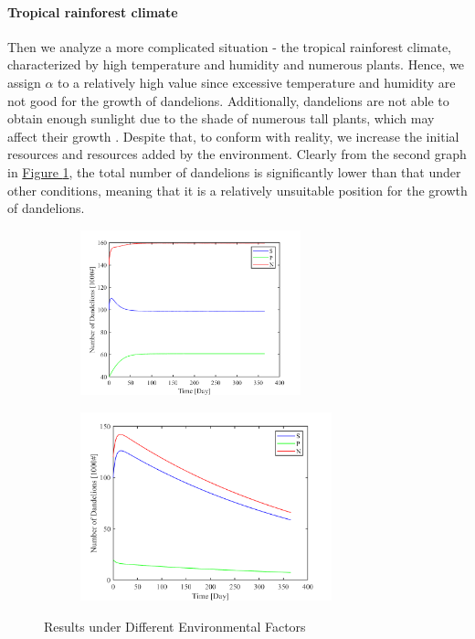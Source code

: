 \documentclass[12pt]{article}
\begin{document}
\paragraph{Tropical rainforest climate} Then we analyze a more complicated situation - the tropical rainforest climate, characterized by high temperature and humidity and numerous plants. Hence, we assign \(\alpha\) to a relatively high value since excessive temperature and humidity are not good for the growth of dandelions. Additionally, dandelions are not able to obtain enough sunlight due to the shade of numerous tall plants, which may affect their growth \cite{dekker_how_2021}. Despite that, to conform with reality, we increase the initial resources and resources added by the environment. Clearly from the second graph in \hyperref[diff_env]{Figure \ref*{diff_env}}, the total number of dandelions is significantly lower than that under other conditions, meaning that it is a relatively unsuitable position for the growth of dandelions.
\begin{figure}[h]
  \centering\begin{subfigure}[b]{0.45\textwidth}
    \centering
    \includegraphics[width=0.7\textwidth]{img/dry.png}
  \end{subfigure}
  \quad
  \begin{subfigure}[b]{0.45\textwidth}
    \centering
    \includegraphics[width=0.8\textwidth]{img/tropical.png}
  \end{subfigure}
  \caption{Results under Different Environmental Factors}
  \label{diff_env}
\end{figure}
\end{document}
